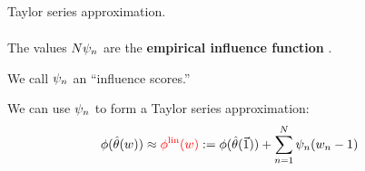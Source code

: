 \begin{frame}[t]{Taylor series approximation.}
\vspace{-2em}
\begin{align*}
%
%
\end{align*}
%
\begin{center}
\begin{minipage}{0.45\textwidth}
\LinearGraph{}
\end{minipage}
\end{center}

\pause
The values $N \psi_n$ are the \textbf{empirical influence function}
\citep{hampel1986robustbook}.

We call $\psi_n$ an ``influence scores.''

\pause
\vspace{1em}
We can use $\psi_n$ to form a Taylor series approximation:
%
\begin{align*}
	\phi(\hat{\theta}(w))
		&\approx
        \color{red}
        \phi^{\mathrm{lin}}(w)
        \color{black}
		:=  \phi(\hat{\theta}(\vec{1})) +
        \sum_{n=1}^N \psi_n (w_n -1)
        \color{black}
\end{align*}

\end{frame}






